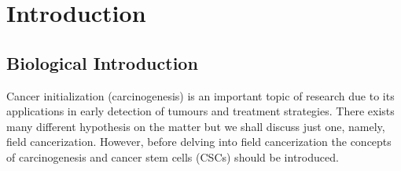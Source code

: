 \documentclass[\main/thesis.tex]{subfiles}
\begin{document}
\chapter{Introduction}

\section{Biological Introduction}

Cancer initialization (carcinogenesis) is an important topic of research due to 
its applications in early detection of tumours and treatment strategies. There 
exists many different hypothesis on the matter but we shall discuss just one, 
namely, field cancerization. However, before delving into field cancerization
the concepts of carcinogenesis and cancer stem cells (CSCs) should be 
introduced.
\end{document}
